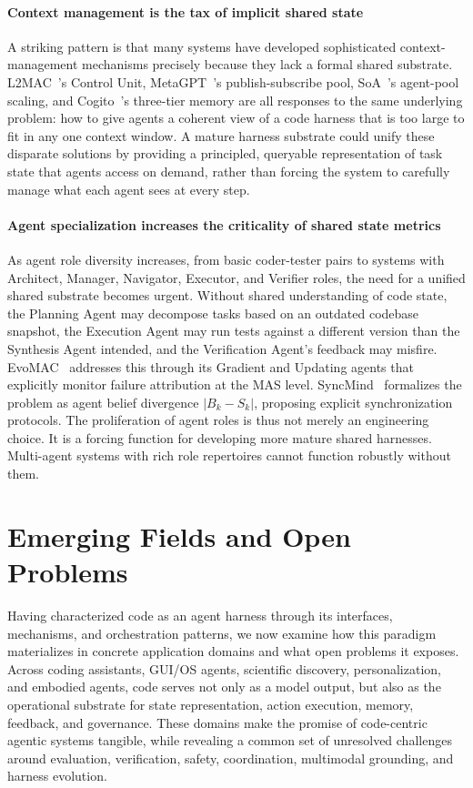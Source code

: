 \documentclass{llmxive}
\begin{document}
\paragraph{Context management is the tax of implicit shared state}
A striking pattern is that many systems have
developed sophisticated context-management mechanisms precisely
because they lack a formal shared substrate.
L2MAC~\cite{Holt2023L2MAC}'s Control Unit,
MetaGPT~\cite{Hong2023MetaGPT}'s publish-subscribe pool,
SoA~\cite{Ishibashi2024SelfOrganized}'s agent-pool scaling, and
Cogito~\cite{Li2025Cogito}'s three-tier memory are all responses
to the same underlying problem: how to give agents a coherent
view of a code harness that is too large to fit in any one
context window. A mature harness substrate could unify these
disparate solutions by providing a principled, queryable
representation of task state that agents access on demand,
rather than forcing the system to carefully manage what each
agent sees at every step.

\paragraph{Agent specialization increases the criticality of shared state metrics}
As agent role diversity increases, from basic coder-tester pairs
to systems with Architect, Manager, Navigator, Executor, and
Verifier roles, the need for a unified shared substrate becomes
urgent. Without shared understanding of code state, the Planning
Agent may decompose tasks based on an outdated codebase snapshot,
the Execution Agent may run tests against a different version
than the Synthesis Agent intended, and the Verification Agent's
feedback may misfire. EvoMAC~\cite{Hu2025EvoMAC} addresses this
through its Gradient and Updating agents that explicitly monitor
failure attribution at the MAS level.
SyncMind~\cite{Guo2025SyncMind} formalizes the problem as agent
belief divergence $|B_k - S_k|$, proposing explicit
synchronization protocols. The proliferation of agent roles is
thus not merely an engineering choice. It is a forcing function
for developing more mature shared harnesses. Multi-agent systems
with rich role repertoires cannot function robustly without them.

\section{Emerging Fields and Open Problems}

Having characterized code as an agent harness through its interfaces, mechanisms, and orchestration patterns, we now examine how this paradigm materializes in concrete application domains and what open problems it exposes. Across coding assistants, GUI/OS agents, scientific discovery, personalization, and embodied agents, code serves not only as a model output, but also as the operational substrate for state representation, action execution, memory, feedback, and governance. These domains make the promise of code-centric agentic systems tangible, while revealing a common set of unresolved challenges around evaluation, verification, safety, coordination, multimodal grounding, and harness evolution.
\end{document}
